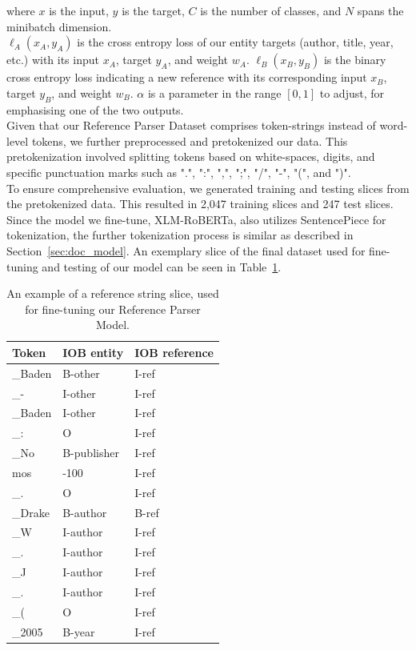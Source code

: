 where $x$ is the input, $y$ is the target, $C$ is the number of classes, and $N$ spans the minibatch dimension.\\
$\ell_A(x_A,y_A)$ is the cross entropy loss of our entity targets (author, title, year, etc.) with its input $x_A$, target $y_A$, and weight $w_A$. $\ell_B(x_B,y_B)$ is the binary cross entropy loss indicating a new reference with its corresponding input $x_B$, target $y_B$, and weight $w_B$. $\alpha$ is a parameter in the range $[0,1]$ to adjust, for emphasising one of the two outputs.\\
Given that our Reference Parser Dataset comprises token-strings instead of word-level tokens, we further preprocessed and pretokenized our data. This pretokenization involved splitting tokens based on white-spaces, digits, and specific punctuation marks such as ".", ":", ",", ";", "/", "-", "(", and ")".\\
To ensure comprehensive evaluation, we generated training and testing slices from the pretokenized data. This resulted in 2,047 training slices and 247 test slices.\\
Since the model we fine-tune, XLM-RoBERTa, also utilizes SentencePiece for tokenization, the further tokenization process is similar as described in Section~\ref{sec:doc_model}. An exemplary slice of the final dataset used for fine-tuning and testing of our model can be seen in Table~\ref{tab:ref_parser_sliced_output}.

\begin{table}[!ht]
    \centering
    \begin{tabular}{|l|l|l|}
    \hline
        \textbf{Token} & \textbf{IOB entity} & \textbf{IOB reference} \\ \hline
        \_Baden & B-other & I-ref \\ \hline
        \_- & I-other & I-ref \\ \hline
        \_Baden & I-other & I-ref \\ \hline
        \_: & O & I-ref \\ \hline
        \_No & B-publisher & I-ref \\ \hline
        mos & -100 & I-ref \\ \hline
        \_. & O & I-ref \\ \hline
        \_Drake & B-author & B-ref \\ \hline
        \_W & I-author & I-ref \\ \hline
        \_. & I-author & I-ref \\ \hline
        \_J & I-author & I-ref \\ \hline
        \_. & I-author & I-ref \\ \hline
        \_( & O & I-ref \\ \hline
        \_2005 & B-year & I-ref \\ \hline
    \end{tabular}
    \caption{An example of a reference string slice, used for fine-tuning our Reference Parser Model.}
    \label{tab:ref_parser_sliced_output}
\end{table}

